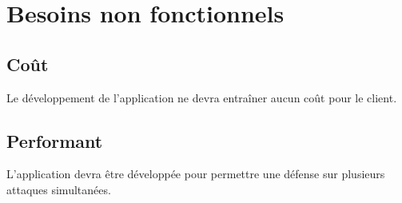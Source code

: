 \newpage




\section{Besoins non fonctionnels}






\subsection{Coût}
Le développement de l'application ne devra entraîner aucun coût pour le client.

\subsection{Performant}
L'application devra être développée pour permettre une défense sur plusieurs attaques simultanées.

